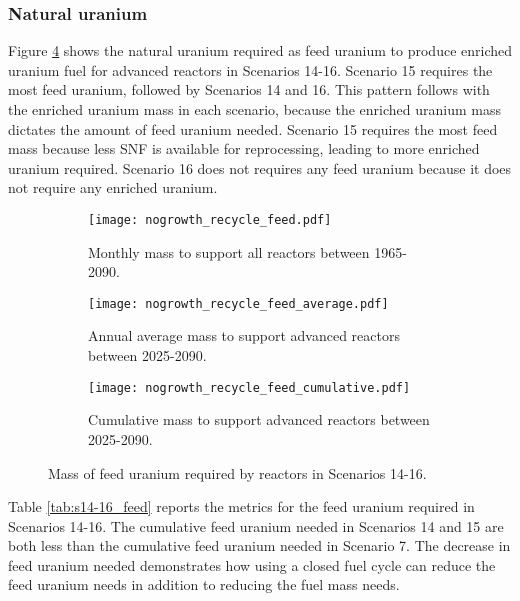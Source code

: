 \subsubsection{Natural uranium}
Figure \ref{fig:nogrowth_recycle_feed} shows 
the natural uranium required as feed uranium to produce enriched 
uranium fuel for advanced reactors in Scenarios 14-16.  
Scenario 15 requires 
the most feed uranium, followed by Scenarios 14 and 16. This pattern follows 
with the enriched uranium mass in each scenario, because the enriched 
uranium mass dictates the amount of feed uranium needed.
Scenario 15 requires the 
most feed mass because less \gls{SNF} is available for reprocessing, 
leading to more 
enriched uranium required. Scenario 
16 does not requires any feed uranium because it does not require any 
enriched uranium. 

\begin{figure}[h!]
    \centering
    \begin{subfigure}[b]{0.45\textwidth}
        \centering
        \texttt{[image: nogrowth\_recycle\_feed.pdf]}
        \caption{Monthly mass 
        to support all reactors between 1965-2090.}
        \label{fig:nogrowth_recycle_all_feed}
    \end{subfigure}
    \hfill
    \begin{subfigure}[b]{0.45\textwidth}
        \centering
        \texttt{[image: nogrowth\_recycle\_feed\_average.pdf]}
        \caption{Annual average  mass 
        to support advanced reactors between 2025-2090.}
        \label{fig:nogrowth_recycle_AR_feed}
    \end{subfigure}
    \begin{subfigure}[b]{0.45\textwidth}
        \centering
        \texttt{[image: nogrowth\_recycle\_feed\_cumulative.pdf]}
        \caption{Cumulative mass to support advanced reactors between 2025-2090.}
        \label{fig:nogrowth_recycle_feed_cumulative}
    \end{subfigure}
       \caption{Mass of feed uranium required by reactors
        in Scenarios 14-16.}
       \label{fig:nogrowth_recycle_feed}
\end{figure}

Table \ref{tab:s14-16_feed} reports the metrics for the feed uranium 
required in Scenarios 14-16. The cumulative feed uranium needed in 
Scenarios 14 and 15 are both less than the cumulative feed uranium 
needed in Scenario 7. The decrease in feed uranium needed demonstrates 
how using a closed fuel cycle can reduce the feed uranium needs in 
addition to reducing the fuel mass needs. 

